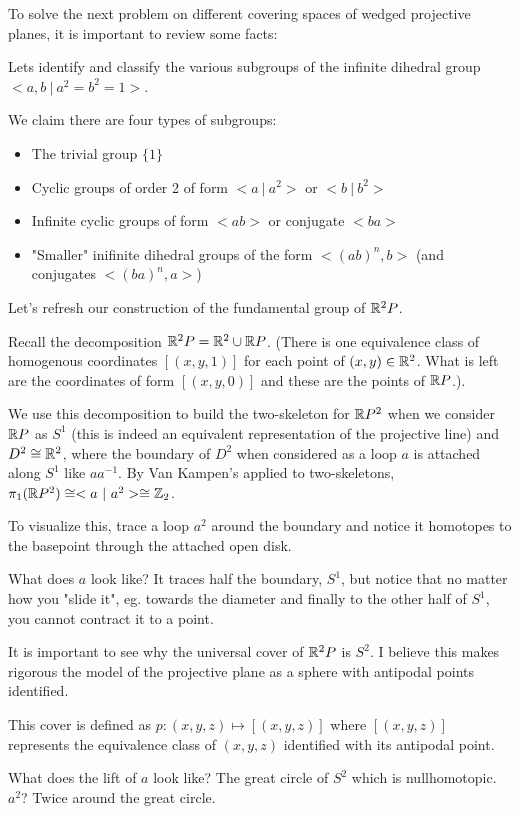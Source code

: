 \documentclass[10pt]{article}
\begin{document}
To solve the next problem on different covering spaces of wedged projective
planes, it is important to review some facts:

\begin{note}

	Lets identify and classify the various subgroups of the infinite dihedral
	group $<a, b ~|~ a^2 = b^2 = 1>$.

	We claim there are four types of subgroups:
	\begin{itemize}
		\item{The trivial group $\{ 1 \}$}
		\item{Cyclic groups of order 2 of form $<a ~|~ a^2>$ or $<b ~|~ b^2>$}
		\item{Infinite cyclic groups of form $<ab>$ or conjugate $<ba>$}
		\item{"Smaller" inifinite dihedral groups of the form $<(ab)^n, b>$ (and
			conjugates $<(ba)^n, a>$)}
	\end{itemize}

\end{note}

\begin{note}
	Let's refresh our construction of the fundamental group of $\mathbb{R}^2P$.

	Recall the decomposition $\mathbb{R}^2P = \mathbb{R}^2 \cup \mathbb{R} P$. (There is one equivalence
	class of homogenous coordinates $[(x, y, 1)]$ for each point of $(x, y) \in
	\mathbb{R}^2$. What is left are the coordinates of form $[(x, y, 0)]$ and these are
	the points of $\mathbb{R} P$.).

	We use this decomposition to build the two-skeleton for $\mathbb{R} P^2$ when we consider $\mathbb{R} P$
	as $S^1$ (this is indeed an equivalent representation of the projective line)
	and $D^2 \cong \mathbb{R}^2$, where the boundary of $D^2$ when considered as a loop
	$a$ is attached along $S^1$ like $aa^{-1}$. By Van Kampen's applied to
	two-skeletons, $\pi_1(\mathbb{R} P^2) \cong <a ~|~ a^2> \cong \mathbb{Z}_2$. 

	To visualize this, trace a loop $a^2$ around the boundary and notice it homotopes to the
	basepoint through the attached open disk. 

	What does $a$ look like? It traces half the boundary, $S^1$, but notice
	that no matter how you "slide it", eg. towards the diameter and finally to
	the other half of $S^1$, you cannot contract it to a point.
\end{note}

\begin{note}
	It is important to see why the universal cover of $\mathbb{R}^2P$ is $S^2$. I believe
	this makes rigorous the model of the projective plane as a sphere with
	antipodal points identified.

	This cover is defined as $p: (x, y, z) \mapsto [(x, y, z)]$ where $[(x, y, z)]$ represents the
	equivalence class of $(x, y, z)$ identified with its antipodal point.

	What does the lift of $a$ look like? The great circle of $S^2$ which is
	nullhomotopic. $a^2$? Twice around the great circle.
\end{note}
\end{document}
